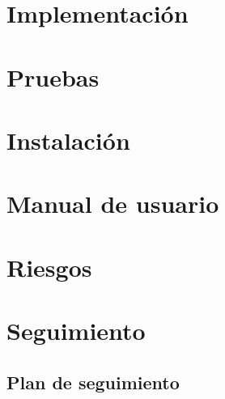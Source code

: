 \documentclass[a4paper,11pt, twoside]{article}
\begin{document}
\section{Implementación}
\section{Pruebas}
\section{Instalación}
\section{Manual de usuario}
\section{Riesgos}
\section{Seguimiento}
\subsection{Plan de seguimiento}
\newpage
\end{document}
